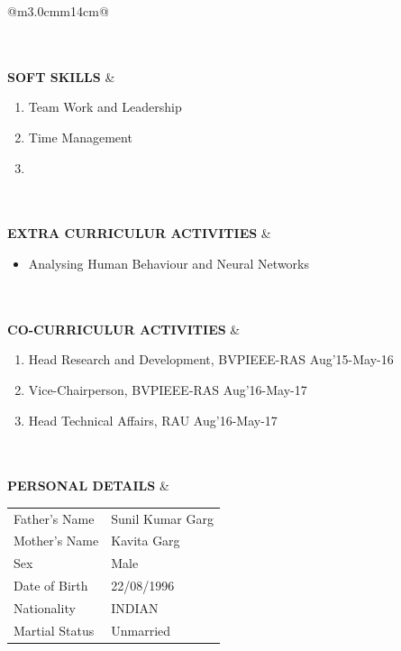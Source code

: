 \documentclass[a4paper]{article}
\begin{document}
\begin{longtable}{@{}m{3.0cm}m{14cm}@{}}
\begin{itemize}
				\end{itemize}
			\\ \\
			
			
			\textrm{\textbf {SOFT SKILLS}} & 
				\begin{enumerate}
					\itemsep -2pt
					\item
					Team Work and Leadership
					\item
					Time Management
					\item
					
				\end{enumerate}
			\\ \\
			
			
			\textrm{\textbf {EXTRA \newline CURRICULUR ACTIVITIES}} & 
				\begin{itemize}
					\itemsep -2pt
					\item
					Analysing Human Behaviour and Neural Networks
				\end{itemize}
			\\ \\
			
			
			\textrm{\textbf {CO-CURRICULUR ACTIVITIES}} & 
				\begin{enumerate}
					\itemsep -2pt
					\item
					Head Research and Development, BVPIEEE-RAS \hfill Aug'15-May-16
					\item
					Vice-Chairperson, BVPIEEE-RAS \hfill Aug'16-May-17
					\item
					Head Technical Affairs, RAU \hfill Aug'16-May-17
				\end{enumerate}
			\\ \\
			
			\textrm{\textbf {PERSONAL DETAILS}} & 
				\begin{center}
					\begin{tabular}{ m{4cm}m{4cm}}
						Father's Name & Sunil Kumar Garg \\
						Mother's Name & Kavita Garg \\
						Sex & Male \\
						Date of Birth & 22/08/1996 \\
						Nationality & INDIAN \\
						Martial Status & Unmarried \\
  					\end{tabular}
				\end{center}
			\\ \\
			

\end{longtable}
\end{document}
